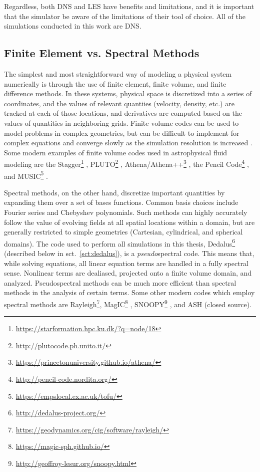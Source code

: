 Regardless, both DNS and LES have benefits and limitations, and it is important that the simulator be aware of the limitations of their tool of choice.
All of the simulations conducted in this work are DNS.

\subsection{Finite Element vs. Spectral Methods}
The simplest and most straightforward way of modeling a physical system numerically is through the use of finite element, finite volume, and finite difference methods.
In these systems, physical space is discretized into a series of coordinates, and the values of relevant quantiies (velocity, density, etc.) are tracked at each of those locations, and derivatives are computed based on the values of quantities in neighboring grids.
Finite volume codes can be used to model problems in complex geometries, but can be difficult to implement for complex equations and converge slowly as the simulation resolution is increased \citep{burns&all2019}.
Some modern examples of finite volume codes used in astrophysical fluid modeling are the Stagger\footnote{\url{https://starformation.hpc.ku.dk/?q=node/18}} \citep{galsgaard2011}, PLUTO\footnote{\url{http://plutocode.ph.unito.it/}} \citep{mignone&all2012}, Athena/Athena++\footnote{\url{https://princetonuniversity.github.io/athena/}} \citep{stone&all2008, stone&all2019}, the Pencil Code\footnote{\url{http://pencil-code.nordita.org/}} \citep{brandenburg&dobler2010}, and MUSIC\footnote{\url{https://empslocal.ex.ac.uk/tofu/}} \citep{goffrey&all2017}.

Spectral methods, on the other hand, discretize important quantities by expanding them over a set of bases functions.
Common basis choices include Fourier series and Chebyshev polynomials.
Such methods can highly accurately follow the value of evolving fields at all spatial locations within a domain, but are generally restricted to simple geometries (Cartesian, cylindrical, and spherical domains).
The code used to perform all simulations in this thesis, Dedalus\footnote{\url{http://dedalus-project.org/}} (described below in sct.~\ref{sct:dedalus}), is a \emph{pseudo}spectral code.
This means that, while solving equations, all linear equation terms are handled in a fully spectral sense.
Nonlinear terms are dealiased, projected onto a finite volume domain, and analyzed. 
Pseudospectral methods can be much more efficient than spectral methods in the analysis of certain terms.
Some other modern codes which employ spectral methods are Rayleigh\footnote{\url{https://geodynamics.org/cig/software/rayleigh/}}, MagIC\footnote{\url{https://magic-sph.github.io/}} \citep{wicht&all2017}, SNOOPY\footnote{\url{http://geoffroy-lesur.org/snoopy.html}} \citep{lesur2015}, and ASH (closed source).

